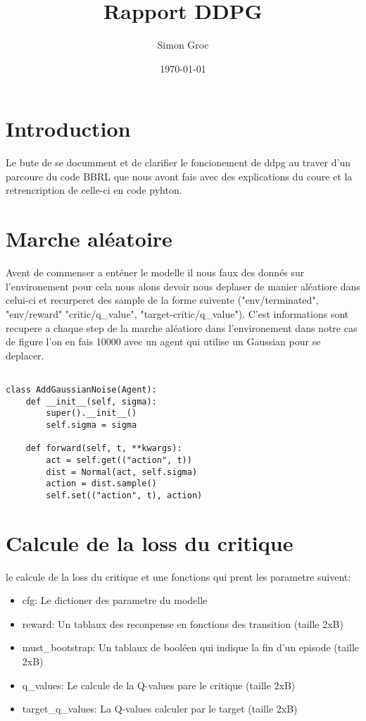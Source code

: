 \documentclass[12pt]{article}
\title{Rapport DDPG}
\author{Simon Groc}
\date{\today} %
\begin{document}
\maketitle %

\tableofcontents %

\section{Introduction}

Le bute de se documment et de clarifier le foncionement de ddpg au traver d'un parcoure du code BBRL que nous avont fais avec des explications du coure et la retrencription de celle-ci en code pyhton.
\section{Marche aléatoire}

Avent de commenser a enténer le modelle il nous faux des donnés sur l'environement pour cela nous alons devoir nous deplaser de manier aléatiore dans celui-ci et recurperet des sample de la forme suivente ("env/terminated", "env/reward" "critic/q\_value", "target-critic/q\_value"). C'est informations sont recupere a chaque step de la marche aléatiore dans l'environement dans notre cas de figure l'on en fais 10000 avec un agent qui utilise un Gaussian pour se deplacer.

\begin{verbatim}

class AddGaussianNoise(Agent):
    def __init__(self, sigma):
        super().__init__()
        self.sigma = sigma

    def forward(self, t, **kwargs):
        act = self.get(("action", t))
        dist = Normal(act, self.sigma)
        action = dist.sample()
        self.set(("action", t), action)

\end{verbatim}



\section{Calcule de la loss du critique}

le calcule de la loss du critique et une fonctions qui prent les parametre suivent:


\begin{itemize}
    \item cfg: Le dictioner des parametre du modelle 
    \item reward: Un tablaux des reconpense en fonctions des transition (taille 2xB)
    \item must\_bootstrap: Un tablaux de booléen qui indique la fin d'un episode (taille 2xB)
    \item q\_values: Le calcule de la Q-values pare le critique (taille 2xB)
    \item target\_q\_values: La Q-values calculer par le target (taille 2xB)
\end{itemize}
\end{document}
